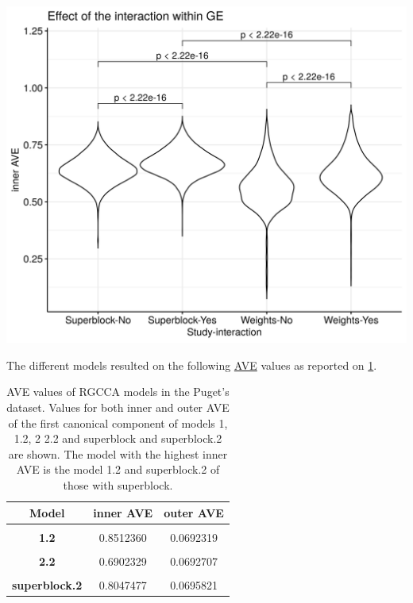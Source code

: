 \documentclass[
  12pt,
  a4paper,
  twoside,
  openright]{book}
\let\origfigure\figure
\let\endorigfigure\endfigure
\renewenvironment{figure}[1][2] {
    \expandafter\origfigure\expandafter[!htbp]
} {
    \endorigfigure
}
\begin{document}
\begin{figure}
\includegraphics[width=1\linewidth]{images/pugets-weights} \caption[Effect of superblock and weights on the inner AVE on Puget's dataset.]{Effect of superblock and weights on the inner AVE on Puget's dataset. Designs with the superblock showed higher inner AVE scores than without it. Interaction yes/no indicates RNA and RNA interaction. Higher inner AVE values are associated with relationships within the GE (p-values shown on top of the violin plots).}\label{fig:puget-weights}
\end{figure}

The different models resulted on the following \protect\hyperlink{acronyms_AVE}{AVE} values as reported on \ref{tab:puget-models-ave}.

\begin{table}[H]

\caption[AVE values of RGCCA models in the Puget's dataset.]{\label{tab:puget-models-ave}AVE values of RGCCA models in the Puget's dataset. Values for both inner and outer AVE of the first canonical component of models 1, 1.2, 2 2.2 and superblock and superblock.2 are shown. The model with the highest inner AVE is the model 1.2 and  superblock.2 of those with superblock.}
\centering
\begin{tabular}[t]{>{}c|c|c}
\hline
\textbf{Model} & \textbf{inner AVE} & \textbf{outer AVE}\\
\hline
\textbf{\cellcolor{gray!6}{1}} & \cellcolor{gray!6}{0.6333592} & \cellcolor{gray!6}{0.0692097}\\
\hline
\textbf{1.2} & 0.8512360 & 0.0692319\\
\hline
\textbf{\cellcolor{gray!6}{2}} & \cellcolor{gray!6}{0.2791546} & \cellcolor{gray!6}{0.0738695}\\
\hline
\textbf{2.2} & 0.6902329 & 0.0692707\\
\hline
\textbf{\cellcolor{gray!6}{superblock}} & \cellcolor{gray!6}{0.7055847} & \cellcolor{gray!6}{0.0734578}\\
\hline
\textbf{superblock.2} & 0.8047477 & 0.0695821\\
\hline
\end{tabular}
\end{table}
\end{document}
